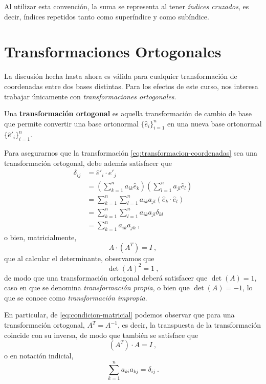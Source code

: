 Al utilizar esta convención, la suma se representa al tener \emph{índices cruzados}, es decir, índices repetidos tanto como superíndice y como subíndice.

\section{Transformaciones Ortogonales}

La discusión hecha hasta ahora es válida para cualquier transformación de coordenadas entre dos bases distintas. Para los efectos de este curso, nos interesa trabajar únicamente con \emph{transformaciones ortogonales}.

\begin{defi} 
    Una \textbf{transformación ortogonal} es aquella transformación de cambio de base que permite convertir una base ortonormal $\{\hat{e}_i\}_{i=1}^n$ en una nueva base ortonormal $\{\hat{e}'_i\}_{i=1}^n$.
\end{defi}

Para asegurarnos que la transformación \eqref{eq:transformacion-coordenadas} sea una transformación ortogonal, debe además satisfacer que
\begin{align}
    \delta_{ij} & = \hat{e}'_i \cdot \hat{e}'_j \\
    & = \left( \sum_{k=1}^n a_{ik} \hat{e}_k \right) \left( \sum_{l=1}^n a_{jl} \hat{e}_l \right) \\
    & = \sum_{k=1}^n \sum_{l=1}^n a_{ik} a_{jl} (\hat{e}_k \cdot \hat{e}_l) \\
    & = \sum_{k=1}^n \sum_{l=1}^n a_{ik} a_{jl} \delta_{kl} \\
    & = \sum_{k=1}^n a_{ik} a_{jk} \ , \label{eq:delta-transformacion-ortogonal}
\end{align}
o bien, matricialmente,
\begin{equation}\label{eq:condicion-matricial}
    A \cdot (A^T) = I \ ,
\end{equation}
que al calcular el determinante, observamos que
\begin{equation}
    \det(A)^2 = 1 \ , 
\end{equation}
de modo que una transformación ortogonal deberá satisfacer que $\det(A) = 1$, caso en que se denomina \emph{transformación propia}, o bien que $\det(A) = -1$, lo que se conoce como \emph{transformación impropia}.

En particular, de \eqref{eq:condicion-matricial} podemos observar que para una transformación ortogonal, $A^T = A^{-1}$, es decir, la transpuesta de la transformación coincide con su inversa, de modo que también se satisface que
\begin{equation}
    (A^T) \cdot A = I \ ,
\end{equation}
o en notación indicial,
\begin{equation}
    \sum_{k=1}^n a_{ki} a_{kj} =  \delta_{ij} \ .
\end{equation}


